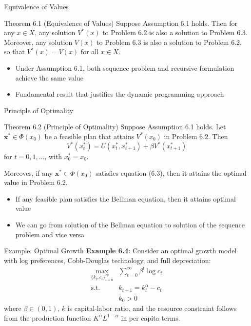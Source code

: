\documentclass[9pt,aspectratio=169]{beamer}
\begin{document}
\begin{frame}{Equivalence of Values}
    \begin{block}{Theorem 6.1 (Equivalence of Values)}
        Suppose Assumption 6.1 holds. Then for any $x \in X$, any solution
        $V^*(x)$ to Problem 6.2 is also a solution to Problem 6.3. Moreover,
        any solution $V(x)$ to Problem 6.3 is also a solution to Problem 6.2,
        so that $V^*(x) = V(x)$ for all $x \in X$.
    \end{block}

    \begin{itemize}
        \item Under Assumption 6.1, both sequence problem and recursive
        formulation achieve the same value
        \item Fundamental result that justifies the dynamic programming
        approach
    \end{itemize}
\end{frame}

\begin{frame}{Principle of Optimality}
\begin{block}{Theorem 6.2 (Principle of Optimality)}
Suppose Assumption 6.1 holds. Let $\mathbf{x}^* \in \Phi(x_0)$ be a feasible
plan that attains $V^*(x_0)$ in Problem 6.2. Then
\begin{equation*}
    \tag{6.3}
    V^*(x^*_t) = U(x^*_t, x^*_{t+1}) + \beta V^*(x^*_{t+1})    
\end{equation*}
for $t = 0, 1, \ldots$, with $x^*_0 = x_0$.

Moreover, if any $\mathbf{x}^* \in \Phi(x_0)$ satisfies equation (6.3), then
it attains the optimal value in Problem 6.2.
\end{block}
\begin{itemize}
  \item If any feasible plan satisfies the Bellman equation, then it attains
  optimal value
  \item We can go from solution of the Bellman equation to solution of the
  sequence problem and vice versa
\end{itemize}
\end{frame}

\begin{frame}{Example: Optimal Growth}
    \textbf{Example 6.4}: Consider an optimal growth model with log
    preferences, Cobb-Douglas technology, and full depreciation:
    \begin{align*}
        \max_{\{k_t,c_t\}_{t=0}^{\infty}} &\sum_{t=0}^{\infty} \beta^t \log c_t \\
        \text{s.t. } &k_{t+1} = k_t^{\alpha} - c_t \\
        &k_0 > 0
    \end{align*}
    where $\beta \in (0,1)$, $k$ is capital-labor ratio, and the resource
    constraint follows from the production function $K^{\alpha}L^{1-\alpha}$
    in per capita terms.
\end{frame}
\end{document}
